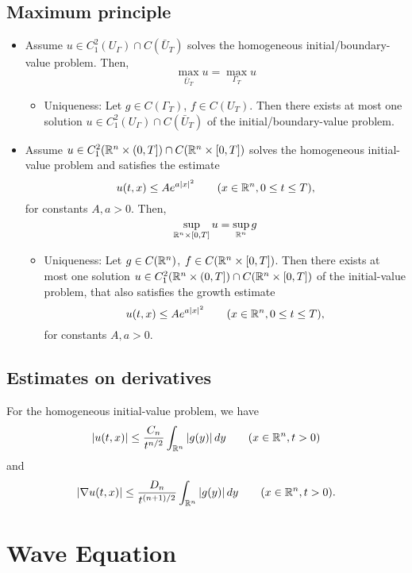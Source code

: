 \documentclass[oneside,a4paper,11pt]{report}
\begin{document}
\subsection{Maximum principle}
\begin{itemize}

\item Assume $u \in C_1^2(U_\Gamma) \cap C(\bar{U}_T) $ solves the homogeneous initial/boundary-value problem. Then,
\[\max_{\bar{U}_T} u = \max_{\Gamma_T} u \]
\begin{itemize}
\item Uniqueness: Let $g \in C(\Gamma_T)$, $f \in C(U_T)$. Then there exists at most one solution $u \in C_1^2(U_\Gamma) \cap C(\bar{U}_T) $ of the initial/boundary-value problem.
\end{itemize}

\item Assume $u \in C_1^2({\mathbb{R}^n} \times (0,T]) \cap C({\mathbb{R}^n} \times [0,T])$ solves the homogeneous initial-value problem and satisfies the estimate 
\[u(t,x) \le Ae^{a|x|^2} \qquad (x \in {\mathbb{R}^n}, 0 \le t \le T), \]
for constants $A,a>0$. Then,
\[ \sup_{{{\mathbb{R}^n}} \times [0,T]} u = \sup_{{\mathbb{R}^n}} g\]
\begin{itemize}
\item Uniqueness: Let $g \in C({\mathbb{R}^n})$, $f \in C({\mathbb{R}^n} \times [0,T])$. Then there exists at most one solution $u \in C_1^2({\mathbb{R}^n} \times (0,T]) \cap C({\mathbb{R}^n} \times [0,T])$ of the initial-value problem, that also satisfies the growth estimate
\[u(t,x) \le Ae^{a|x|^2} \qquad (x \in {\mathbb{R}^n}, 0 \le t \le T), \]
for constants $A,a>0$. 
\end{itemize}

\end{itemize}

\subsection{Estimates on derivatives}
For the homogeneous initial-value problem, we have
\[ |u(t,x)| \le \frac{C_n}{ t^{n/2}} \int_{{\mathbb{R}^n}} |g(y)| \,dy \qquad (x \in {\mathbb{R}^n}, t > 0) \]
and
\[ |\nabla u(t,x)| \le \frac{D_n}{t^{(n+1)/2}} \int_{{\mathbb{R}^n}} |g(y)| \,dy \qquad (x \in {\mathbb{R}^n}, t > 0). \]
 
\section{Wave Equation}
\end{document}
